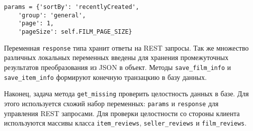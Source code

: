 \medskip
\begin{lstlisting}[style=Python]
  params = {'sortBy': 'recentlyCreated',
    'group': 'general',
    'page': 1,
    'pageSize': self.FILM_PAGE_SIZE}
\end{lstlisting}
\medskip

Переменная \texttt{response} типа хранит ответы на REST запросы. Так же множество различных локальных переменных введены для хранения промежуточных результатов преобразования из JSON в объект. Методы \texttt{save\_film\_info} и \texttt{save\_item\_info} формируют конечную транзацкию в базу данных.

Наконец, задача метода \texttt{get\_missing} проверить целостность данных в базе. Для этого используется схожий набор переменных: \texttt{params} и \texttt{response} для управления REST запросами. Для проверки целостности со стороны клиента используются массивы класса \texttt{item\_reviews}, \texttt{seller\_reviews} и \texttt{film\_reviews}.
